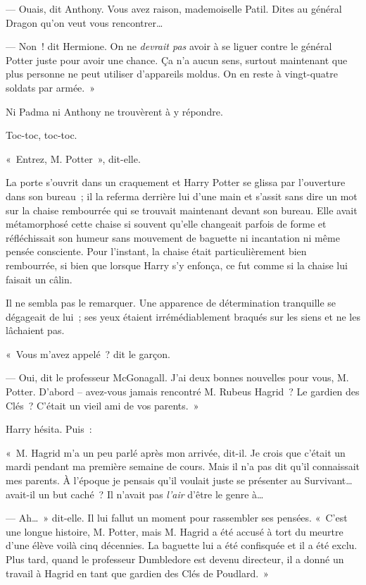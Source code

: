 --- Ouais, dit Anthony.
Vous avez raison, mademoiselle Patil.
Dites au général Dragon qu'on veut vous rencontrer…

--- Non~! dit Hermione.
On ne \emph{devrait pas} avoir à se liguer contre le général Potter juste pour avoir une chance.
Ça n'a aucun sens, surtout maintenant que plus personne ne peut utiliser d'appareils moldus.
On en reste à vingt-quatre soldats par armée.~»

Ni Padma ni Anthony ne trouvèrent à y répondre.

\later

Toc-toc, toc-toc.

«~Entrez, M. Potter~», dit-elle.

La porte s'ouvrit dans un craquement et Harry Potter se glissa par l'ouverture dans son bureau~; il la referma derrière lui d'une main et s'assit sans dire un mot sur la chaise rembourrée qui se trouvait maintenant devant son bureau.
Elle avait métamorphosé cette chaise si souvent qu'elle changeait parfois de forme et réfléchissait son humeur sans mouvement de baguette ni incantation ni même pensée consciente.
Pour l'instant, la chaise était particulièrement bien rembourrée, si bien que lorsque Harry s'y enfonça, ce fut comme si la chaise lui faisait un câlin.

Il ne sembla pas le remarquer.
Une apparence de détermination tranquille se dégageait de lui~; ses yeux étaient irrémédiablement braqués sur les siens et ne les lâchaient pas.

«~Vous m'avez appelé~? dit le garçon.

--- Oui, dit le professeur McGonagall.
J'ai deux bonnes nouvelles pour vous, M. Potter.
D'abord -- avez-vous jamais rencontré M. Rubeus Hagrid~?
Le gardien des Clés~?
C'était un vieil ami de vos parents.~»

Harry hésita.
Puis~:

«~M. Hagrid m'a un peu parlé après mon arrivée, dit-il.
Je crois que c'était un mardi pendant ma première semaine de cours.
Mais il n'a pas dit qu'il connaissait mes parents.
À l'époque je pensais qu'il voulait juste se présenter au Survivant… avait-il un but caché~?
Il n'avait pas \emph{l'air} d'être le genre à…

--- Ah…~» dit-elle.
Il lui fallut un moment pour rassembler ses pensées.
«~C'est une longue histoire, M. Potter, mais M. Hagrid a été accusé à tort du meurtre d'une élève voilà cinq décennies.
La baguette lui a été confisquée et il a été exclu.
Plus tard, quand le professeur Dumbledore est devenu directeur, il a donné un travail à Hagrid en tant que gardien des Clés de Poudlard.~»


